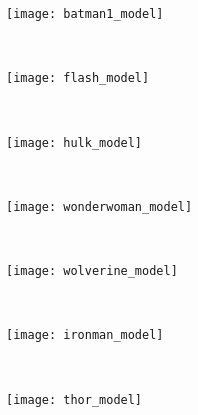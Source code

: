 \begin{figure}[!ht]
	\centering
	\begin{subfigure}[b]{0.1\textwidth}
		\centering
		\texttt{[image: batman1\_model]}	
	\end{subfigure}
	~ %
    \begin{subfigure}[b]{0.1\textwidth}
		\centering
		\texttt{[image: flash\_model]}	
	\end{subfigure}
    ~ %
    \begin{subfigure}[b]{0.1\textwidth}
		\centering
		\texttt{[image: hulk\_model]}	
	\end{subfigure}
	~ %
    \begin{subfigure}[b]{0.1\textwidth}
		\centering
		\texttt{[image: wonderwoman\_model]}	
	\end{subfigure}
    ~ %
    \begin{subfigure}[b]{0.1\textwidth}
		\centering
		\texttt{[image: wolverine\_model]}	
	\end{subfigure}
    ~ %
    \begin{subfigure}[b]{0.1\textwidth}
		\centering
		\texttt{[image: ironman\_model]}	
	\end{subfigure}
    ~ %
    \begin{subfigure}[b]{0.1\textwidth}
		\centering
		\texttt{[image: thor\_model]}	
	\end{subfigure} \\[2ex]
    

\end{figure}
